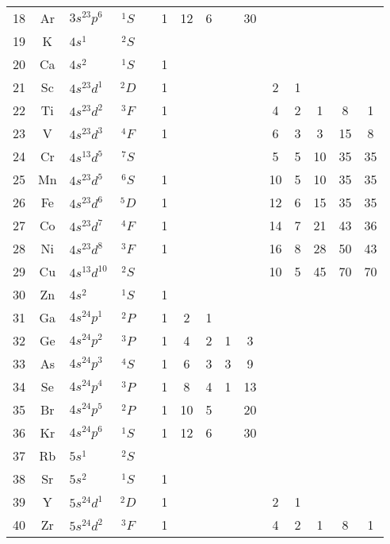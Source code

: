 \begin{table}
\begin{center}
\begin{tabular}{cclcccccccccccc}
18&Ar & $3s^23p^6$ &$^1S$&& 1  & 12 & 6 &     &30  &   &   &    &    &     \\
19&K  & $4s^1    $ &$^2S$&&    &    &   &     &    &   &   &    &    &     \\
20&Ca & $4s^2    $ &$^1S$&& 1  &    &   &     &    &   &   &    &    &     \\
21&Sc & $4s^23d^1$ &$^2D$&& 1  &    &   &     &    & 2 & 1 &    &    &     \\
22&Ti & $4s^23d^2$ &$^3F$&& 1  &    &   &     &    & 4 & 2 & 1  & 8  & 1   \\
23&V  & $4s^23d^3$ &$^4F$&& 1  &    &   &     &    & 6 & 3 & 3  & 15 & 8   \\
24&Cr & $4s^13d^5$ &$^7S$&&    &    &   &     &    & 5 & 5 & 10 & 35 & 35  \\
25&Mn & $4s^23d^5$ &$^6S$&& 1  &    &   &     &    &10 & 5 & 10 & 35 & 35  \\
26&Fe & $4s^23d^6$ &$^5D$&& 1  &    &   &     &    &12 & 6 & 15 & 35 & 35  \\
27&Co & $4s^23d^7$ &$^4F$&& 1  &    &   &     &    &14 & 7 & 21 & 43 & 36  \\
28&Ni & $4s^23d^8$ &$^3F$&& 1  &    &   &     &    &16 & 8 & 28 & 50 & 43  \\
29&Cu & $4s^13d^{10}$&$^2S$&&  &    &   &     &    &10 & 5 & 45 & 70 & 70  \\
30&Zn & $4s^2     $&$^1S$&& 1  &    &   &     &    &   &   &    &    &     \\
31&Ga & $4s^24p^1$ &$^2P$&& 1  & 2  & 1 &     &    &   &   &    &    &     \\
32&Ge & $4s^24p^2$ &$^3P$&& 1  & 4  & 2 &  1  &3   &   &   &    &    &     \\
33&As & $4s^24p^3$ &$^4S$&& 1  & 6  & 3 &  3  &9   &   &   &    &    &     \\
34&Se & $4s^24p^4$ &$^3P$&& 1  & 8  & 4 &  1  &13  &   &   &    &    &     \\
35&Br & $4s^24p^5$ &$^2P$&& 1  & 10 & 5 &     &20  &   &   &    &    &     \\
36&Kr & $4s^24p^6$ &$^1S$&& 1  & 12 & 6 &     &30  &   &   &    &    &     \\
37&Rb & $5s^1    $ &$^2S$&&    &    &   &     &    &   &   &    &    &     \\
38&Sr & $5s^2    $ &$^1S$&& 1  &    &   &     &    &   &   &    &    &     \\
39&Y  & $5s^24d^1$ &$^2D$&& 1  &    &   &     &    & 2 & 1 &    &    &     \\
40&Zr & $5s^24d^2$ &$^3F$&& 1  &    &   &     &    & 4 & 2 & 1  & 8  & 1   \\

\end{tabular}
\end{center}
\end{table}
